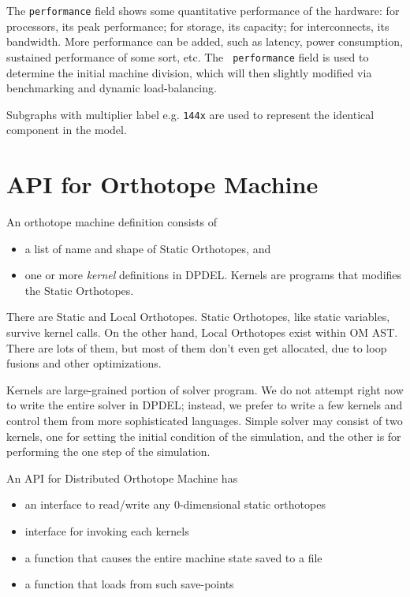 \documentclass[twocolumn]{article}
\begin{document}
The {\tt performance} field shows some quantitative performance of the
hardware: for processors, its peak performance; for storage, its capacity; for
interconnects, its bandwidth. More performance can be added, such as latency,
power consumption, sustained performance of some sort, etc. The {\tt
  performance} field is used to determine the initial machine division, which
will then slightly modified via benchmarking and dynamic load-balancing.

Subgraphs with multiplier label e.g. {\tt 144x} are used to represent the
identical component in the model.



\section{API for Orthotope Machine}
\label{SectionAPI}

An orthotope machine definition consists of
\begin{itemize}
  \item a list of name and shape of Static Orthotopes, and
  \item one or more {\em kernel} definitions in DPDEL. Kernels are programs
    that modifies the Static Orthotopes.
\end{itemize}

There are Static and Local Orthotopes. Static Orthotopes, like static
variables, survive kernel calls. On the other hand, Local Orthotopes exist
within OM AST. There are lots of them, but most of them don't even get
allocated, due to loop fusions and other optimizations.

Kernels are large-grained portion of solver program. We do not attempt right
now to write the entire solver in DPDEL; instead, we prefer to write a few
kernels and control them from more sophisticated languages. Simple solver may
consist of two kernels, one for setting the initial condition of the
simulation, and the other is for performing the one step of the simulation.

An API for Distributed Orthotope Machine has
\begin{itemize}
  \item an interface to read/write any 0-dimensional static orthotopes
  \item interface for invoking each kernels
  \item a function that causes the entire machine state saved to a file
  \item a function that loads from such save-points
\end{itemize}
\end{document}
